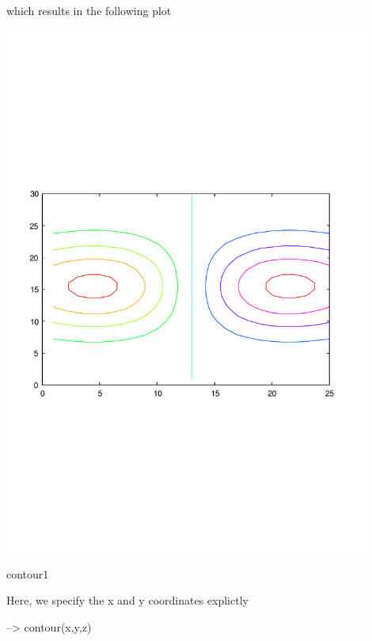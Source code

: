 which results in the following plot  
\begin{DoxyImage}
\includegraphics[width=12cm]{contour1}
\caption{contour1}
\end{DoxyImage}
 Here, we specify the {\ttfamily x} and {\ttfamily y} coordinates explictly


\begin{DoxyVerbInclude}
--> contour(x,y,z)
\end{DoxyVerbInclude}


